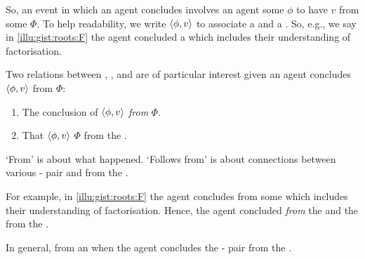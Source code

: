 \begin{note}
  So, an event in which an agent concludes involves an agent \evaling{} some  \(\phi\) to have  \(v\) from some \pool{} \(\Phi\).
  To help readability, we write \(\langle\phi, v\rangle\) to associate a  and a .
  So, e.g., we say in \autoref{illu:gist:roots:F} the agent concluded  a \pool{} which includes their understanding of factorisation.
\end{note}


\begin{note}
  Two relations between , , and  are of particular interest given an  agent concludes \(\langle\phi, v\rangle\) from \(\Phi\):
  \begin{enumerate}
  \item
    The \agents{} conclusion of \(\langle\phi, v\rangle\) \emph{from} \(\Phi\).
  \item
    That \(\langle\phi, v\rangle\) \emph{} \(\Phi\) from the \agpe{}.
  \end{enumerate}
  `From' is about what happened.
  `Follows from' is about connections between various - pair and \pool{} from the \agpe{}.

  For example, in \autoref{illu:gist:roots:F} the agent concludes  from some \pool{} which includes their understanding of factorisation.
  Hence, the agent concluded  \emph{from} the \pool{} and  \emph{\fof{}} the \pool{} from the \agpe{}.

  In general,  from an \agpe{} when the agent concludes the - pair from the \pool{}.
\end{note}



